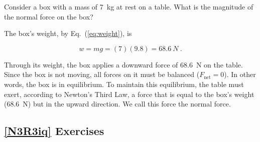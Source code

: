 \documentclass{article}
\numberwithin{equation}{section}
\numberwithin{figure}{section}
\begin{document}
\begin{example} \label{A8Qdlc}
Consider a box with a mass of \SI{7}{kg} at rest on a table. What is the magnitude of the normal force on the box? 
\end{example}

\Solution The box's weight, by Eq.~(\ref{eq:weight}), is

\begin{equation*}
    w = m g = (7)(9.8) = \SI{68.6}{N}\ .
\end{equation*}

Through its weight, the box applies a downward force of \SI{68.6}{N} on the table. Since the box is not moving, all forces on it must be balanced ($F_{\text{net}} = 0$). In other words, the box is in equilibrium. To maintain this equilibrium, the table must exert, according to Newton's Third Law, a force that is equal to the box's weight (\SI{68.6}{N}) but in the upward direction. We call this force the normal force.

\begin{center}
\end{center}


\cyanhrule

\subsection*{\ref{N3R3iq} Exercises}
\end{document}
